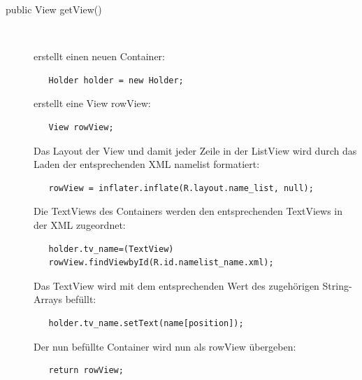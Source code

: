 \begin{description}
\item [public View getView()]~\par
erstellt einen neuen Container: 
\begin{lstlisting}
   Holder holder = new Holder;
\end{lstlisting}
erstellt eine View rowView:
\begin{lstlisting}
   View rowView;
\end{lstlisting}
Das Layout der View und damit jeder Zeile in der ListView wird durch das Laden der entsprechenden XML namelist formatiert:
\begin{lstlisting}
   rowView = inflater.inflate(R.layout.name_list, null);
\end{lstlisting}
Die TextViews des Containers werden den entsprechenden TextViews in der XML zugeordnet:
\begin{lstlisting}
   holder.tv_name=(TextView)
   rowView.findViewbyId(R.id.namelist_name.xml);
\end{lstlisting}
Das TextView wird mit dem entsprechenden Wert des zugehörigen String-Arrays befüllt:
\begin{lstlisting}
   holder.tv_name.setText(name[position]);
\end{lstlisting}
Der nun befüllte Container wird nun als rowView übergeben:
\begin{lstlisting}
   return rowView;
\end{lstlisting}
\newpage


\end{description}
